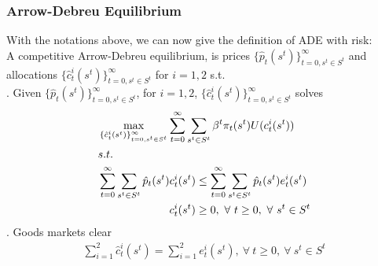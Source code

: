 \documentclass{article}
\begin{document}
\subsubsection{Arrow-Debreu Equilibrium}
With the notations above, we can now give the definition of ADE with risk:\\
A competitive Arrow-Debreu equilibrium, is prices $\{\hat{p}_t (s^t)\}^\infty_{t=0, s^t \in S^t}$ and allocations $\{\hat{c}^i_t (s^t)\}^\infty_{t=0, s^t \in S^t}$ for $i = 1, 2$ s.t.\\
. Given $\{\hat{p}_t (s^t)\}^\infty_{t=0, s^t \in S^t}$, for $i = 1, 2$, $\{\hat{c}^i_t (s^t)\}^\infty_{t=0, s^t \in S^t}$ solves
\begin{align*}
	&\max\limits_{\{\hat{c}^i_t (s^t)\}^\infty_{t=0, s^t \in S^t}} \sum\limits^\infty_{t=0} \sum\limits_{s^t \in S^t} \beta^t \pi_t(s^t) U(c^i_t(s^t))\\
	&s.t.\\
	& \sum\limits^\infty_{t=0} \sum\limits_{s^t \in S^t} \hat{p}_t (s^t) c^i_t (s^t) \leq \sum\limits^\infty_{t=0} \sum\limits_{s^t \in S^t} \hat{p}_t (s^t) e^i_t (s^t)\\
	&\indent\indent\indent\indent\ \, c^i_t(s^t) \geq 0,\ \forall\ t \geq 0,\ \forall\ s^t \in S^t 
\end{align*}
. Goods markets clear
\begin{align*}
	\sum\limits^2_{i=1} \hat{c}^i_t (s^t) = \sum\limits^2_{i=1} e^i_t (s^t),\ \forall\ t \geq 0,\ \forall\ s^t \in S^t
\end{align*}
\end{document}
